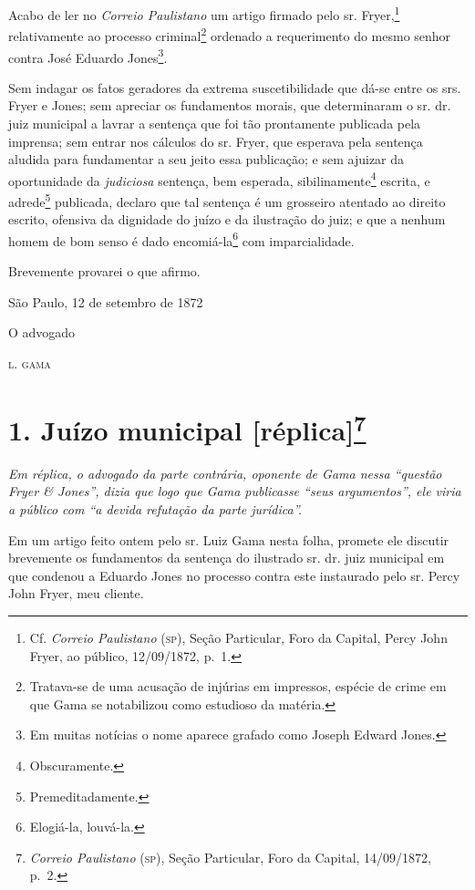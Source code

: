Acabo de ler no \emph{Correio Paulistano} um artigo firmado pelo sr.
Fryer,\footnote{ Cf. \emph{Correio Paulistano} (\textsc{sp}), Seção Particular,
  Foro da Capital, Percy John Fryer, ao público, 12/09/1872, p.~1.}
relativamente ao processo criminal\footnote{ Tratava-se de uma acusação
  de injúrias em impressos, espécie de crime em que Gama se notabilizou
  como estudioso da matéria.} ordenado a requerimento do mesmo senhor
contra José Eduardo Jones\footnote{ Em muitas notícias o nome aparece
  grafado como Joseph Edward Jones.}.

Sem indagar os fatos geradores da extrema suscetibilidade que dá-se
entre os srs. Fryer e Jones; sem apreciar os fundamentos morais, que
determinaram o sr. dr. juiz municipal a lavrar a sentença que foi tão
prontamente publicada pela imprensa; sem entrar nos cálculos do sr.
Fryer, que esperava pela sentença aludida para fundamentar a seu jeito
essa publicação; e sem ajuizar da oportunidade da \emph{judiciosa}
sentença, bem esperada, sibilinamente\footnote{ Obscuramente.} escrita,
e adrede\footnote{ Premeditadamente.} publicada, declaro que tal
sentença é um grosseiro atentado ao direito escrito, ofensiva da
dignidade do juízo e da ilustração do juiz; e que a nenhum homem de bom
senso é dado encomiá-la\footnote{ Elogiá-la, louvá-la.} com
imparcialidade.

Brevemente provarei o que afirmo.

\begin{flushright}
São Paulo, 12 de setembro de 1872

O advogado

\textsc{l. gama}
\end{flushright}

\chapter{1. Juízo municipal {[}réplica{]}\footnote{\emph{Correio Paulistano} (\textsc{sp}), Seção Particular, Foro
  da Capital, 14/09/1872, p.~2.}} %

\begin{didascalia}
\emph{Em réplica, o advogado da parte contrária, oponente de Gama nessa
``questão Fryer \& Jones'', dizia que logo que Gama publicasse ``seus
argumentos'', ele viria a público com ``a devida refutação da parte
jurídica''.}
\end{didascalia}

Em um artigo feito ontem pelo sr. Luiz Gama nesta folha, promete ele
discutir brevemente os fundamentos da sentença do ilustrado sr. dr. juiz
municipal em que condenou a Eduardo Jones no processo contra este
instaurado pelo sr. Percy John Fryer, meu cliente.

